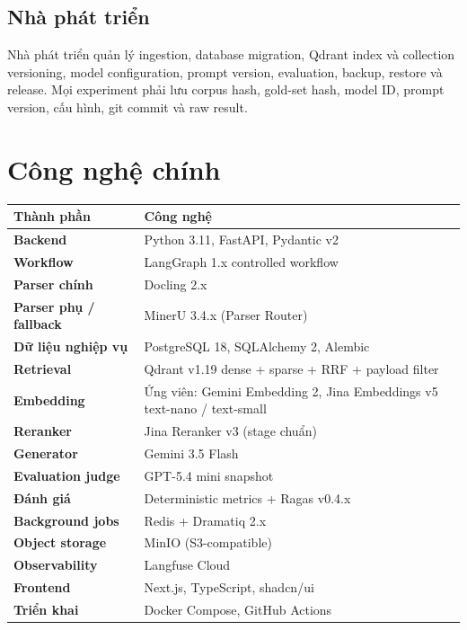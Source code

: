 \documentclass[12pt,a4paper]{article}
\begin{document}
\subsection{Nhà phát triển}

Nhà phát triển quản lý ingestion, database migration, Qdrant index và collection versioning, model configuration, prompt version, evaluation, backup, restore và release. Mọi experiment phải lưu corpus hash, gold-set hash, model ID, prompt version, cấu hình, git commit và raw result.

\section{Công nghệ chính}

\renewcommand{\arraystretch}{1.25}
\begin{center}
\begin{tabularx}{\textwidth}{>{\bfseries}p{4.0cm} X}
\toprule
Thành phần & Công nghệ \\
\midrule
Backend & Python 3.11, FastAPI, Pydantic v2 \\
Workflow & LangGraph 1.x controlled workflow \\
Parser chính & Docling 2.x \\
Parser phụ / fallback & MinerU 3.4.x (Parser Router) \\
Dữ liệu nghiệp vụ & PostgreSQL 18, SQLAlchemy 2, Alembic \\
Retrieval & Qdrant v1.19 dense + sparse + RRF + payload filter \\
Embedding & Ứng viên: Gemini Embedding 2, Jina Embeddings v5 text-nano / text-small \\
Reranker & Jina Reranker v3 (stage chuẩn) \\
Generator & Gemini 3.5 Flash \\
Evaluation judge & GPT-5.4 mini snapshot \\
Đánh giá & Deterministic metrics + Ragas v0.4.x \\
Background jobs & Redis + Dramatiq 2.x \\
Object storage & MinIO (S3-compatible) \\
Observability & Langfuse Cloud \\
Frontend & Next.js, TypeScript, shadcn/ui \\
Triển khai & Docker Compose, GitHub Actions \\
\bottomrule
\end{tabularx}
\end{center}
\end{document}
